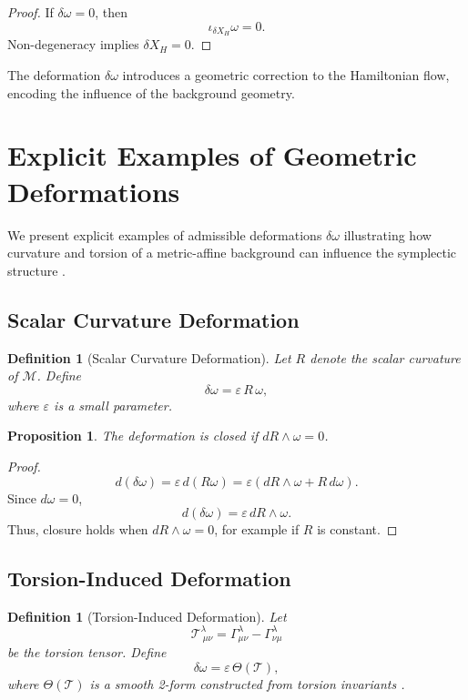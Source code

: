 \documentclass[11pt, a4paper]{article}
\newtheorem{proposition}[theorem]{Proposition}
\newtheorem{definition}[theorem]{Definition}
\begin{document}
\begin{proof}
If $\delta\omega = 0$, then
\[
\iota_{\delta X_H}\omega = 0.
\]
Non-degeneracy implies $\delta X_H = 0$.
\end{proof}

The deformation $\delta\omega$ introduces a geometric correction to the
Hamiltonian flow, encoding the influence of the background geometry.



\section{Explicit Examples of Geometric Deformations}

We present explicit examples of admissible deformations $\delta\omega$
illustrating how curvature and torsion of a metric-affine background
can influence the symplectic structure \cite{hehl1995,shapiro2002}.

\subsection{Scalar Curvature Deformation}

\begin{definition}[Scalar Curvature Deformation]
Let $R$ denote the scalar curvature of $\mathcal{M}$. Define
\[
\delta\omega = \varepsilon\, R\, \omega,
\]
where $\varepsilon$ is a small parameter.
\end{definition}

\begin{proposition}
The deformation is closed if $dR \wedge \omega = 0$.
\end{proposition}

\begin{proof}
\[
d(\delta\omega)
= \varepsilon\, d(R\omega)
= \varepsilon (dR \wedge \omega + R\, d\omega).
\]
Since $d\omega = 0$,
\[
d(\delta\omega) = \varepsilon\, dR \wedge \omega.
\]
Thus, closure holds when $dR \wedge \omega = 0$, for example if $R$ is constant.
\end{proof}

\subsection{Torsion-Induced Deformation}

\begin{definition}[Torsion-Induced Deformation]
Let
\[
\mathcal{T}^\lambda_{\ \mu\nu}
= \Gamma^\lambda_{\mu\nu} - \Gamma^\lambda_{\nu\mu}
\]
be the torsion tensor. Define
\[
\delta\omega = \varepsilon\, \Theta(\mathcal{T}),
\]
where $\Theta(\mathcal{T})$ is a smooth 2-form constructed from torsion
invariants \cite{poplawski2010}.
\end{definition}
\end{document}
